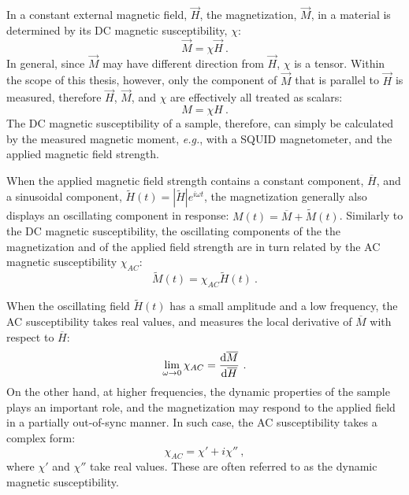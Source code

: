 In a constant external magnetic field, $\vec{H}$, the magnetization, $\vec{M}$, in a material is determined by its DC magnetic susceptibility, $\chi$:
\begin{equation}%
    \vec{M} = \chi\vec{H}~.%
\end{equation}%
%
In general, since $\vec{M}$ may have different direction from $\vec{H}$, $\chi$ is a tensor. Within the scope of this thesis, however, only the component of $\vec{M}$ that is parallel to $\vec{H}$ is measured, therefore $\vec{H}$, $\vec{M}$, and $\chi$ are effectively all treated as scalars:
\begin{equation}%
    M = \chi{}H~.%
\end{equation}%
%
The DC magnetic susceptibility of a sample, therefore, can simply be calculated by the measured magnetic moment, \textit{e.g.}, with a SQUID magnetometer, and the applied magnetic field strength.

When the applied magnetic field strength contains a constant component, $\overline{H}$, and a sinusoidal component, $\widetilde{H}(t)=\left|\widetilde{H}\right|e^{i\omega{}t}$, the magnetization generally also displays an oscillating component in response: $M(t) = \overline{M} + \widetilde{M}(t)$. Similarly to the DC magnetic susceptibility, the oscillating components of the the magnetization and of the applied field strength are in turn related by the AC magnetic susceptibility $\chi_{AC}$:
\begin{equation}%
    \widetilde{M}(t) = \chi_{AC}\widetilde{H}(t)~.%
\end{equation}%

When the oscillating field $\widetilde{H}(t)$ has a small amplitude and a low frequency, the AC susceptibility takes real values, and measures the local derivative of $\overline{M}$ with respect to $\overline{H}$:%
\begin{equation}%
    \lim\limits_{\omega \to 0}\chi_{AC} = \frac{\diff\overline{M}}{\diff\overline{H}}~.%
\end{equation}%
%
On the other hand, at higher frequencies, the dynamic properties of the sample plays an important role, and the magnetization may respond to the applied field in a partially out-of-sync manner. In such case, the AC susceptibility takes a complex form:%
\begin{equation}%
    \chi_{AC} = \chi' + i\chi''~,%
\end{equation}%
where $\chi'$ and $\chi''$ take real values. These are often referred to as the dynamic magnetic susceptibility.

